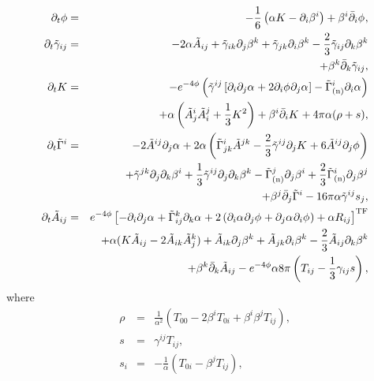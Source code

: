 \documentclass[useAMS,usenatbib]{iopart}
\begin{document}
\begin{eqnarray}
  \dt{\phi} & = & -\frac{1}{6} \left ( \alpha K - \pdu{\beta}{i}{i} \right) + \upwindu{\phi}{}{i}, \label{eq:bssn_ev_start}\\
  \dt{\tlg_{ij}} & = & -2\alpha \tlA_{ij} + \tlg_{ik} \pdu{\beta}{k}{j}
                   + \tlg_{jk} \pdu{\beta}{k}{i}
                    -\frac{2}{3} \tlg_{ij} \pdu{\beta}{k}{k}\nonumber \\
                       & &  + \upwindl{\tlg}{ij}{k}, \\
  \dt{K} & = & -\emfp \left ( \tlg^{ij} \left [ \pdpdu{\alpha}{}{i}{j}
               +2\pdu{\phi}{}{i}\pdu{\alpha}{}{j} \right ] 
               - \tlGn^{i}\pdu{\alpha}{}{i} \right ) \nonumber \\
         &   & + \alpha \left ( \tlA^{i}_{j} \tlA^{j}_{i} +\frac{1}{3} K^2
               \right ) + \upwindu{K}{}{i} + 4 \pi \alpha ( \rho + s ), \\
  \dt{\tlG^{i}} & = & -2 \tlA^{ij} \pdu{\alpha}{}{j} + 2 \alpha \left (
                    \tlG^{i}_{jk} \tlA^{jk} - \frac{2}{3} \tlg^{ij}
                    \pdu{K}{}{j} +  
                  6 \tlA^{ij} \pdu{\phi}{}{j}\right )
                 \nonumber\\
                  & &                     +\tlg^{jk} \pdpdu{\beta}{i}{j}{k} + \frac{1}{3}
                    \tlg^{ij} \pdpdu{\beta}{k}{j}{k} -\tlGn^{j}\pdu{\beta}{i}{j}
                    + \frac{2}{3} \tlGn^{i}\pdu{\beta}{j}{j} \nonumber \\
                &   & + \upwindu{\tlG}{i}{j} -16 \pi \alpha \tlg^{ij} s_j, \\
  \dt{\tlA_{ij}} & = & \emfp \left [ -\pdpdu{\alpha}{}{i}{j} + \tlG^{k}_{ij}
                       \pdu{\alpha}{}{k} + 2 \left ( \pdu{\alpha}{}{i}
                       \pdu{\phi}{}{j}+\pdu{\alpha}{}{j} \pdu{\phi}{}{i}\right ) 
                       +\alpha R_{ij} \right ]^{\mathrm{TF}} \nonumber\\
                 & & +\alpha ( K \tlA_{ij}- 2 \tlA_{ik} \tlA^{k}_{j} )
                       + \tlA_{ik} \pdu{\beta}{k}{j} 
                       + \tlA_{jk} \pdu{\beta}{k}{i}
                       - \frac{2}{3} \tlA_{ij} \pdu{\beta}{k}{k} \nonumber \\
                 &   & +\upwindl{\tlA}{ij}{k} - \emfp \alpha 8 \pi
                       \left (T_{ij}-\frac{1}{3} \gamma_{ij} s\right ), 
		       \label{eq:bssn_ev_end}
                       \end{eqnarray}
where 
\begin{eqnarray}
  \rho & = & \frac{1}{\alpha^2} ( T_{00} - 2 \beta^{i} T_{0i} +
             \beta^{i}\beta^{j} T_{ij} ),\label{eq:BSSN_rho} \\
  s & = & \gamma^{ij} T_{ij}, \\
  s_{i} & = & -\frac{1}{\alpha} ( T_{0i} - \beta^{j} T_{ij}),\label{eq:BSSN_Si}
\end{eqnarray}
\end{document}
